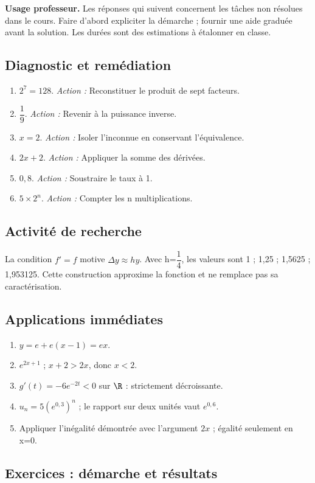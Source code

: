 \label{C09-CORR}
\textbf{Usage professeur.} Les réponses qui suivent concernent les tâches non résolues dans le cours. Faire d’abord expliciter la démarche ; fournir une aide graduée avant la solution. Les durées sont des estimations à étalonner en classe.
\subsection*{Diagnostic et remédiation}
\begin{enumerate}
\item $2^7=128$. \textit{Action :} Reconstituer le produit de sept facteurs.
\item $\dfrac{1}{9}$. \textit{Action :} Revenir à la puissance inverse.
\item $x=2$. \textit{Action :} Isoler l’inconnue en conservant l’équivalence.
\item $2x+2$. \textit{Action :} Appliquer la somme des dérivées.
\item $0{,}8$. \textit{Action :} Soustraire le taux à 1.
\item $5\times2^n$. \textit{Action :} Compter les n multiplications.
\end{enumerate}
\subsection*{Activité de recherche}
La condition $f\prime=f$ motive $\Delta y\approx h y$. Avec h=$\dfrac{1}{4}$, les valeurs sont 1 ; 1,25 ; 1,5625 ; 1,953125. Cette construction approxime la fonction et ne remplace pas sa caractérisation.
\subsection*{Applications immédiates}
\begin{enumerate}
\item $y=e+e(x-1)=ex$.
\item $e^{2x+1}$ ; $x+2>2x$, donc $x<2$.
\item $g\prime(t)=-6e^{-2t}<0$ sur $\R$ : strictement décroissante.
\item $u_n=5(e^{0{,}3})^n$ ; le rapport sur deux unités vaut $e^{0{,}6}$.
\item Appliquer l’inégalité démontrée avec l’argument $2x$ ; égalité seulement en x=0.
\end{enumerate}
\subsection*{Exercices : démarche et résultats}
